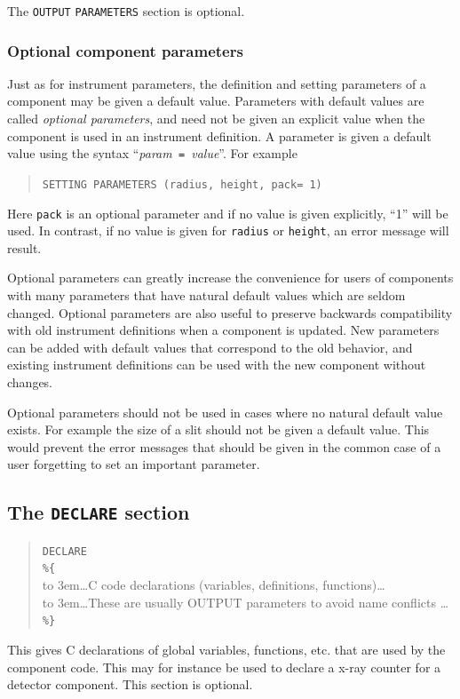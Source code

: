The \texttt{OUTPUT} \texttt{PARAMETERS} section is optional.

\subsubsection{Optional component parameters}

Just as for instrument parameters, the definition and setting parameters of a
component may be given a default value. Parameters with default values are
called \emph{optional parameters}, and need not be given an explicit value when
the component is used in an instrument definition. A parameter is given a
default value using the syntax ``\textit{param}\texttt{ = }\textit{value}''.
For example
\begin{quote}
  \texttt{SETTING PARAMETERS (radius, height, pack= 1)}
\end{quote}
Here \verb+pack+ is an optional parameter and if no value is given
explicitly, ``1'' will be used. In contrast, if no value is
  given for \texttt{radius} or \texttt{height}, an error message will
  result.

Optional parameters can greatly increase the convenience for users of
components with many parameters that have natural default values which
are seldom changed. Optional parameters are also useful to preserve
backwards compatibility with old instrument definitions when a component
is updated. New parameters can be added with default values that
correspond to the old behavior, and existing instrument definitions can
be used with the new component without changes.

Optional parameters should not be used in cases where no
natural default value exists. For example the size of a slit should not be given a default value. 
This would prevent the error messages that should be given in the common case of a
user forgetting to set an important parameter.


\subsection{The \texttt{DECLARE} section}
\label{s:comp-declare}
\begin{quote}
  \texttt{DECLARE} \\
  \verb|%{| \\
  \hbox to 3em{}\ldots C code declarations (variables, definitions, functions)\ldots \\
  \hbox to 3em{}\ldots These are usually OUTPUT parameters to avoid name conflicts \ldots \\
  \verb|%}|
\end{quote}
This gives C declarations of global variables, functions, etc. that are used by the
component code. This may for instance be used to declare a x-ray
counter for a detector component. This section is optional.

